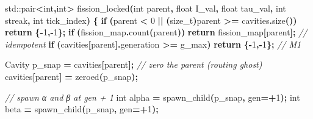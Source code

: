 \documentclass[
  11pt,
  a4paper,
]{article}
\newenvironment{Shaded}{\begin{snugshade}}{\end{snugshade}}
\newcommand{\BuiltInTok}[1]{#1}
\newcommand{\CommentTok}[1]{\textcolor[rgb]{0.56,0.35,0.01}{\textit{#1}}}
\newcommand{\ControlFlowTok}[1]{\textcolor[rgb]{0.13,0.29,0.53}{\textbf{#1}}}
\newcommand{\DataTypeTok}[1]{\textcolor[rgb]{0.13,0.29,0.53}{#1}}
\newcommand{\DecValTok}[1]{\textcolor[rgb]{0.00,0.00,0.81}{#1}}
\newcommand{\NormalTok}[1]{#1}
\newcommand{\OperatorTok}[1]{\textcolor[rgb]{0.81,0.36,0.00}{\textbf{#1}}}
\newcommand{\VariableTok}[1]{\textcolor[rgb]{0.00,0.00,0.00}{#1}}
\begin{document}
\begin{Shaded}
\begin{Highlighting}[]
\BuiltInTok{std::}\NormalTok{pair}\OperatorTok{\textless{}}\DataTypeTok{int}\OperatorTok{,}\DataTypeTok{int}\OperatorTok{\textgreater{}}\NormalTok{ fission\_locked}\OperatorTok{(}\DataTypeTok{int}\NormalTok{ parent}\OperatorTok{,} \DataTypeTok{float}\NormalTok{ I\_val}\OperatorTok{,} \DataTypeTok{float}\NormalTok{ tau\_val}\OperatorTok{,}
                                   \DataTypeTok{int}\NormalTok{ streak}\OperatorTok{,} \DataTypeTok{int}\NormalTok{ tick\_index}\OperatorTok{)} \OperatorTok{\{}
    \ControlFlowTok{if} \OperatorTok{(}\NormalTok{parent }\OperatorTok{\textless{}} \DecValTok{0} \OperatorTok{||} \OperatorTok{(}\DataTypeTok{size\_t}\OperatorTok{)}\NormalTok{parent }\OperatorTok{\textgreater{}=}\NormalTok{ cavities}\OperatorTok{.}\NormalTok{size}\OperatorTok{())} \ControlFlowTok{return} \OperatorTok{\{{-}}\DecValTok{1}\OperatorTok{,{-}}\DecValTok{1}\OperatorTok{\};}
    \ControlFlowTok{if} \OperatorTok{(}\NormalTok{fission\_map}\OperatorTok{.}\NormalTok{count}\OperatorTok{(}\NormalTok{parent}\OperatorTok{))} \ControlFlowTok{return}\NormalTok{ fission\_map}\OperatorTok{[}\NormalTok{parent}\OperatorTok{];}    \CommentTok{// idempotent}
    \ControlFlowTok{if} \OperatorTok{(}\NormalTok{cavities}\OperatorTok{[}\NormalTok{parent}\OperatorTok{].}\NormalTok{generation }\OperatorTok{\textgreater{}=} \VariableTok{g\_max}\OperatorTok{)} \ControlFlowTok{return} \OperatorTok{\{{-}}\DecValTok{1}\OperatorTok{,{-}}\DecValTok{1}\OperatorTok{\};}     \CommentTok{// M1}

\NormalTok{    Cavity p\_snap }\OperatorTok{=}\NormalTok{ cavities}\OperatorTok{[}\NormalTok{parent}\OperatorTok{];}
    \CommentTok{// zero the parent (routing ghost)}
\NormalTok{    cavities}\OperatorTok{[}\NormalTok{parent}\OperatorTok{]} \OperatorTok{=}\NormalTok{ zeroed}\OperatorTok{(}\NormalTok{p\_snap}\OperatorTok{);}

    \CommentTok{// spawn α and β at gen + 1}
    \DataTypeTok{int}\NormalTok{ alpha }\OperatorTok{=}\NormalTok{ spawn\_child}\OperatorTok{(}\NormalTok{p\_snap}\OperatorTok{,}\NormalTok{ gen}\OperatorTok{=+}\DecValTok{1}\OperatorTok{);}
    \DataTypeTok{int}\NormalTok{ beta  }\OperatorTok{=}\NormalTok{ spawn\_child}\OperatorTok{(}\NormalTok{p\_snap}\OperatorTok{,}\NormalTok{ gen}\OperatorTok{=+}\DecValTok{1}\OperatorTok{);}


\end{Highlighting}
\end{Shaded}
\end{document}
